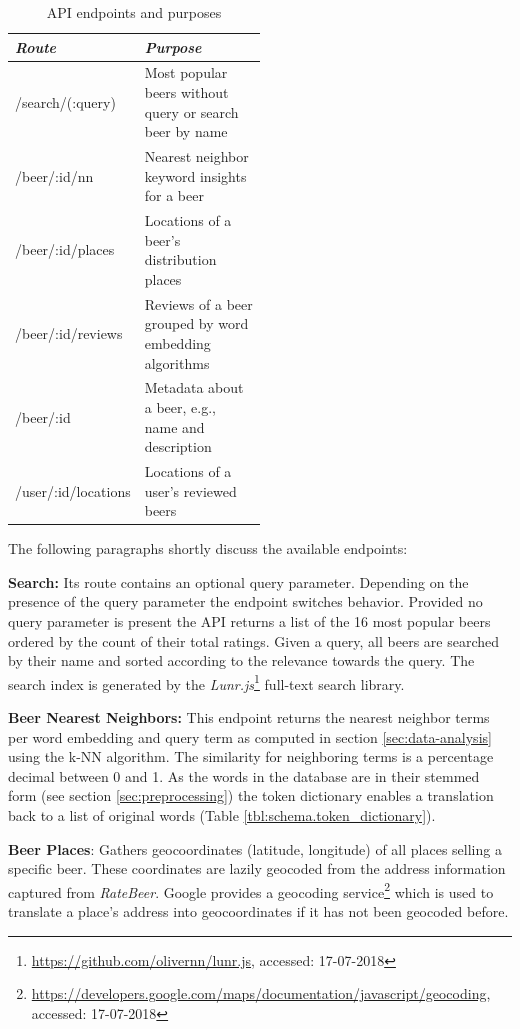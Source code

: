 \begin{table}[h]
    \centering
    \begin{tabular}{ l p{0.5\linewidth} }
        \hline
        \emph{Route} & \emph{Purpose} \\
        \hline
        /search/(:query) & Most popular beers without query or search beer by name \\
        /beer/:id/nn & Nearest neighbor keyword insights for a beer \\
        /beer/:id/places & Locations of a beer's distribution places \\
        /beer/:id/reviews & Reviews of a beer grouped by word embedding algorithms \\
        /beer/:id & Metadata about a beer, e.g., name and description \\
        /user/:id/locations & Locations of a user's reviewed beers \\
        \hline
    \end{tabular}
    \caption{API endpoints and purposes} \label{tbl:api-endpoints}
\end{table}

The following paragraphs shortly discuss the available endpoints:

\noindent
\textbf{Search:} Its route contains an optional query parameter.
Depending on the presence of the query parameter the endpoint switches behavior.
Provided no query parameter is present the API returns a list of the 16 most popular beers ordered by the count of their total ratings.
Given a query, all beers are searched by their name and sorted according to the relevance towards the query.
The search index is generated by the \textit{Lunr.js}\footnote{\url{https://github.com/olivernn/lunr.js}, accessed: 17-07-2018} full-text search library.

\noindent
\textbf{Beer Nearest Neighbors:} This endpoint returns the nearest neighbor terms per word embedding and query term as computed in section \ref{sec:data-analysis} using the k-NN algorithm.
The similarity for neighboring terms is a percentage decimal between 0 and 1.
As the words in the database are in their stemmed form (see section \ref{sec:preprocessing}) the token dictionary enables a translation back to a list of original words (Table \ref{tbl:schema.token_dictionary}).

\noindent
\textbf{Beer Places}: Gathers geocoordinates (latitude, longitude) of all places selling a specific beer.
These coordinates are lazily geocoded from the address information captured from \textit{RateBeer}.
Google provides a geocoding service\footnote{\url{https://developers.google.com/maps/documentation/javascript/geocoding}, accessed: 17-07-2018} which is used to translate a place's address into geocoordinates if it has not been geocoded before.

